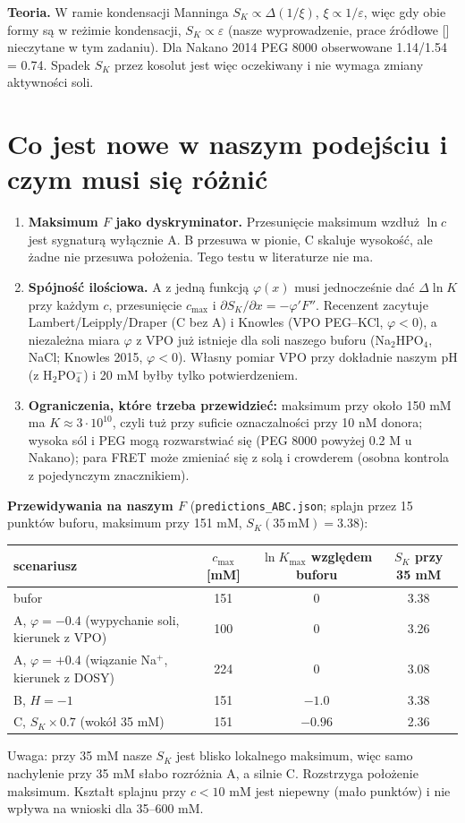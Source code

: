 \documentclass[11pt,a4paper]{article}
\newcommand{\citone}[1]{\citsep\ref{#1}\gdef\citsep{,\,}}
\newcommand{\cit}[1]{[\gdef\citsep{}\forcsvlist{\citone}{#1}]}
\begin{document}
\textbf{Teoria.} W ramie kondensacji Manninga $S_K\propto\Delta(1/\xi)$, $\xi\propto1/\varepsilon$, więc gdy obie formy są w reżimie kondensacji, $S_K\propto\varepsilon$ (nasze wyprowadzenie, prace źródłowe \cit{b:mann72,b:rec78} nieczytane w tym zadaniu). Dla Nakano 2014 PEG 8000 obserwowane 1.14/1.54 = 0.74. Spadek $S_K$ przez kosolut jest więc oczekiwany i nie wymaga zmiany aktywności soli.

\section{Co jest nowe w naszym podejściu i czym musi się różnić}
\begin{enumerate}[leftmargin=*]
\item \textbf{Maksimum $F$ jako dyskryminator.} Przesunięcie maksimum wzdłuż $\ln c$ jest sygnaturą wyłącznie A. B przesuwa w pionie, C skaluje wysokość, ale żadne nie przesuwa położenia. Tego testu w literaturze nie ma.
\item \textbf{Spójność ilościowa.} A z jedną funkcją $\varphi(x)$ musi jednocześnie dać $\Delta\ln K$ przy każdym $c$, przesunięcie $c_\text{max}$ i $\partial S_K/\partial x=-\varphi'F''$. Recenzent zacytuje Lambert/Leipply/Draper (C bez A) i Knowles (VPO PEG--KCl, $\varphi<0$), a niezależna miara $\varphi$ z VPO już istnieje dla soli naszego buforu (Na$_2$HPO$_4$, NaCl; Knowles 2015, $\varphi<0$). Własny pomiar VPO przy dokładnie naszym pH (z H$_2$PO$_4^-$) i 20 mM byłby tylko potwierdzeniem.
\item \textbf{Ograniczenia, które trzeba przewidzieć:} maksimum przy około 150 mM ma $K\approx3\cdot10^{10}$, czyli tuż przy suficie oznaczalności przy 10 nM donora; wysoka sól i PEG mogą rozwarstwiać się (PEG 8000 powyżej 0.2 M u Nakano); para FRET może zmieniać się z solą i crowderem (osobna kontrola z pojedynczym znacznikiem).
\end{enumerate}

\textbf{Przewidywania na naszym $F$} (\texttt{predictions\_ABC.json}; splajn przez 15 punktów buforu, maksimum przy 151 mM, $S_K(35\,\text{mM})=3.38$):
\begin{center}\small
\begin{tabular}{lccc}
\toprule
scenariusz & $c_\text{max}$ [mM] & $\ln K_\text{max}$ względem buforu & $S_K$ przy 35 mM\\
\midrule
bufor & 151 & 0 & 3.38\\
A, $\varphi=-0.4$ (wypychanie soli, kierunek z VPO) & 100 & 0 & 3.26\\
A, $\varphi=+0.4$ (wiązanie Na$^+$, kierunek z DOSY) & 224 & 0 & 3.08\\
B, $H=-1$ & 151 & $-1.0$ & 3.38\\
C, $S_K\times0.7$ (wokół 35 mM) & 151 & $-0.96$ & 2.36\\
\bottomrule
\end{tabular}\end{center}
Uwaga: przy 35 mM nasze $S_K$ jest blisko lokalnego maksimum, więc samo nachylenie przy 35 mM słabo rozróżnia A, a silnie C. Rozstrzyga położenie maksimum. Kształt splajnu przy $c<10$ mM jest niepewny (mało punktów) i nie wpływa na wnioski dla 35--600 mM.
\end{document}
